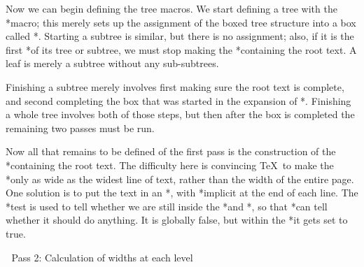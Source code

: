 Now we can begin defining the tree macros.  We start defining a tree
with the *\tree* macro; this merely sets up the assignment of the
boxed tree structure into a box called *\treebox*.  Starting a subtree
is similar, but there is no assignment; also, if it is the first
*\subtree* of its tree or subtree, we must stop making the *\vbox*
containing the root text.  A leaf is merely a subtree without any
sub-subtrees.

\vb
\newbox\treebox
\def\tree{\global\setbox\treebox=\boxtree}
\def\subtree{\ettext \boxtree}
\def\leaf#1{\subtree#1\endsubtree}
\endvb

Finishing a subtree merely involves first making sure the root text is
complete, and second
completing the box that was started in the expansion of *\subtree*.
Finishing a whole tree involves both of those steps, but then after the
box is completed the remaining two passes must be run.

\vb
\def\endsubtree{\ettext \egroup}
\def\endtree{\endsubtree \settreesizes \typesettree}
\endvb


Now all that remains to be defined of the first pass is the construction
of the *\vbox* containing the root text.  The difficulty here is
convincing \TeX\ to make the *\vbox* only as wide as the widest line
of text, rather than the width of the entire page.  One solution is to
put the text in an *\halign*, with *\crcr* implicit at the end of each line.
The *\iftreetext* test is used to tell whether we are still inside the
*\halign* and *\vbox*, so that *\ettext* can tell whether it should do
anything.  It is globally false, but within the *\vbox* it gets set to true.

\vb
\newif\iftreetext\treetextfalse         %
\def\boxtree{\hbox\bgroup               %
  \baselineskip 2.5ex                   %
  \tabskip 0pt                          %
  \vbox\bgroup                          %
  \treetexttrue                         %
  \let\par\crcr \obeylines              %
  \halign\bgroup##\hfil\cr}             %
\def\ettext{\iftreetext                 %
  \crcr\egroup \egroup \fi}             %
\endvb

\beginsection Pass 2: Calculation of widths at each level

